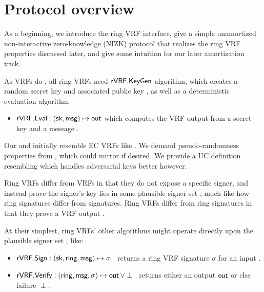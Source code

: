 \section{Protocol overview}
\label{sec:overview}

As a beginning, we introduce the ring VRF interface, give a simple
unamortized non-interactive zero-knowledge (NIZK) protocol that
realizes the ring VRF properties discussed later,
and give some intuition for our later amortization trick.

As VRFs do \cite{vrf_micali},
all ring VRFs need ${\mathsf{rVRF}}.{\mathsf{KeyGen}}$ algorithm,
 which creates a random secret key \sk and associated public key \pk,
as well as a deterministic evaluation algorithm
\begin{itemize}
\item ${\mathsf{rVRF}}.{\mathsf{Eval}} : (\mathsf{sk},\mathsf{msg}) \mapsto {\ensuremath{\mathsf{out}}}$ which computes the VRF output \Out from a secret key \sk and a message \msg.
\end{itemize}
%
Our \KeyGen and \Eval initially resemble EC VRFs like \cite{nsec5,VXEd25519,draft-irtf-cfrg-vrf-10}.
We demand pseudo-randomness properties from \Eval, which could mirror
\cite{vrf_micali} if desired.  We provide a UC definition resembling
\cite{praos,ucvrf} which handles adversarial keys better however.

Ring VRFs differ from VRFs in that they do not expose a specific signer,
and instead prove the signer's key lies in some plausible signer set \ring,
 much like how ring signatures differ from signatures.
Ring VRFs differ from ring signatures in that they prove a VRF output \Out.

At their simplest,
ring VRFs' other algorithms might operate directly upon
 the plausible signer set \ring, like:
\begin{itemize}
\item ${\mathsf{rVRF}}.{\mathsf{Sign}} : (\mathsf{sk},\mathsf{ring},\mathsf{msg}) \mapsto \sigma$ \,
    returns a ring VRF signature $\sigma$ for an input \msg.
\item ${\mathsf{rVRF}}.{\mathsf{Verify}} : (\mathsf{ring},\mathsf{msg},\sigma) \mapsto {\ensuremath{\mathsf{out}}} \, \lor \perp$ \,
    returns either an output ${\mathsf{out}}$ or else failure $\perp$.
\end{itemize}

